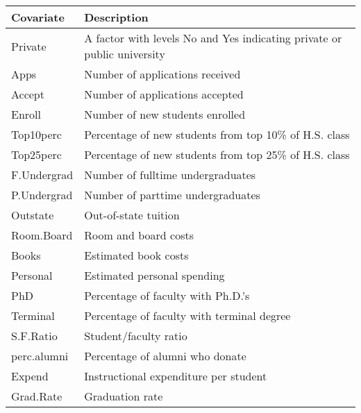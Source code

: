 \documentclass{amsart}[12pt]
\begin{document}
\begin{tabular}{|ll|}
	\hline
	Covariate   & Description                                                             \\
	\hline
	Private     & A factor with levels No and Yes indicating private or public university \\
	Apps        & Number of applications received                                         \\
	Accept      & Number of applications accepted                                         \\
	Enroll      & Number of new students enrolled                                         \\
	Top10perc   & Percentage of new students from top 10\% of H.S. class                  \\
	Top25perc   & Percentage of new students from top 25\% of H.S. class                  \\
	F.Undergrad & Number of fulltime undergraduates                                       \\
	P.Undergrad & Number of parttime undergraduates                                       \\
	Outstate    & Out-of-state tuition                                                    \\
	Room.Board  & Room and board costs                                                    \\
	Books       & Estimated book costs                                                    \\
	Personal    & Estimated personal spending                                             \\
	PhD         & Percentage of faculty with Ph.D.’s                                    \\
	Terminal    & Percentage of faculty with terminal degree                              \\
	S.F.Ratio   & Student/faculty ratio                                                   \\
	perc.alumni & Percentage of alumni who donate                                         \\
	Expend      & Instructional expenditure per student                                   \\
	Grad.Rate   & Graduation rate                                                         \\
	\hline
\end{tabular}
\end{document}
